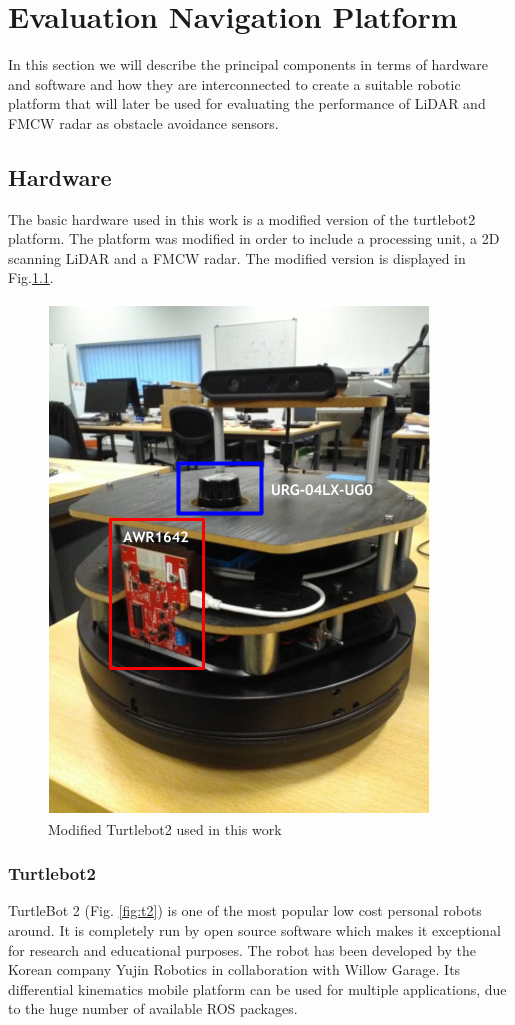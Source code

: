 \chapter{Evaluation Navigation Platform }

In this section we will describe the principal components in terms of hardware and software and how they are interconnected to create a suitable robotic platform that will later be used for evaluating the performance of \ac{LiDAR} and \ac{FMCW} \ac{radar} as obstacle avoidance sensors.


\section{Hardware}
The basic hardware used in this work is a  modified version of the  turtlebot2 platform.
The platform was modified in order to include a processing unit, a 2D scanning \ac{LiDAR} and a \ac{FMCW} radar. The modified version is displayed in Fig.\ref{fig::turlebot2M}. 

\begin{figure}[ht!] 
\centerline{\includegraphics [width=0.4 \textwidth]{imgs/chapter4/turtlebot2.PNG}}
\caption{Modified Turtlebot2 used in this work}
\label{fig::turlebot2M}
\end{figure}

\subsection{Turtlebot2}
TurtleBot 2 (Fig. \ref{fig:t2}) is one of the  most popular low cost personal robots around. It is completely run by open source software which makes it exceptional for research and educational purposes. The robot has been developed by the Korean company Yujin Robotics in collaboration with Willow Garage. Its differential kinematics mobile platform can be used for multiple applications, due to the huge number of available ROS packages. 

